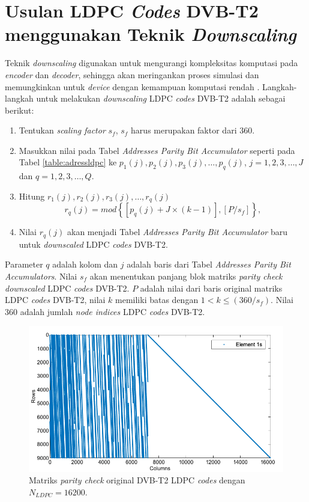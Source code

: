 \section{Usulan LDPC \textit{Codes} DVB-T2 menggunakan Teknik \textit{Downscaling}}

Teknik \textit{downscaling} digunakan untuk mengurangi kompleksitas komputasi pada \textit{encoder} dan \textit{decoder}, sehingga akan meringankan proses simulasi dan memungkinkan untuk \textit{device} dengan kemampuan komputasi rendah \cite{scale}. Langkah-langkah untuk melakukan \textit{downscaling} LDPC \textit{codes} DVB-T2 adalah sebagai berikut: 

\begin{enumerate}
	\item Tentukan \textit{scaling factor} $s_f$, $s_f$ harus merupakan faktor dari $360$. 
	\item Masukkan nilai pada Tabel \textit{Addresses Parity Bit Accumulator} seperti pada Tabel \ref{table:adressldpc} ke $p_{1}(j), p_{2}(j), p_{3}(j), \dots$$, p_{q}(j)$, $j= 1, 2, 3, \dots, J$  dan $q= 1, 2, 3, \dots, Q$. 
	\item Hitung $r_{1}(j), r_{2}(j), r_{3}(j), \dots, r_{q}(j)$
	\begin{equation}
	r_{q}(j)=mod\left \{ \left [ p_q(j) + J \times \left ( k-1 \right ) \right ],\left [ P/s_f \right ] \right \},
	\end{equation}
	\item Nilai $r_q(j)$ akan menjadi Tabel \textit{Addresses Parity Bit Accumulator} baru untuk \textit{downscaled} LDPC \textit{codes} DVB-T2. 
\end{enumerate}
Parameter $q$ adalah kolom dan $j$ adalah baris dari Tabel \textit{Addresses Parity Bit Accumulators}.  Nilai $s_f$ akan menentukan panjang blok matriks \textit{parity check} \textit{downscaled} LDPC \textit{codes} DVB-T2. $P$ adalah nilai dari baris original matriks LDPC \textit{codes} DVB-T2, nilai $k$ memiliki batas dengan $1< k \leq \left ( 360/s_f \right )$. Nilai $360$ adalah jumlah \textit{node indices} LDPC \textit{codes} DVB-T2.


\begin{figure}[b!]
	\centering
	\includegraphics[width=1\textwidth]
	{pics/hs(1-2)-2}
	\caption{Matriks \textit{parity check} original DVB-T2 LDPC \textit{codes} dengan $N_{LDPC}=16200$.}
	\label{fig:hori}
\end{figure}

